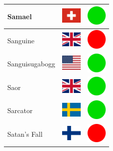 \documentclass[12pt, a4paper, twoside]{report}
\begin{document}
\begin{center}
\begin{longtable}{|p{5cm}|p{2cm}|p{2cm}|}
 Samael                                                     & \includegraphics[width=1cm]{../4x3/ch} &   \includegraphics[width=1cm]{../likes/y} \\ \hline
 Sanguine                                                   & \includegraphics[width=1cm]{../4x3/gb} &   \includegraphics[width=1cm]{../likes/n} \\ \hline
 Sanguisugabogg                                             & \includegraphics[width=1cm]{../4x3/us} &   \includegraphics[width=1cm]{../likes/y} \\ \hline
 Saor                                                       & \includegraphics[width=1cm]{../4x3/gb} &   \includegraphics[width=1cm]{../likes/y} \\ \hline
 Sarcator                                                   & \includegraphics[width=1cm]{../4x3/se} &   \includegraphics[width=1cm]{../likes/y} \\ \hline
 Satan's Fall                                               & \includegraphics[width=1cm]{../4x3/fi} &   \includegraphics[width=1cm]{../likes/n} \\ \hline

\end{longtable}
\end{center}
\end{document}
